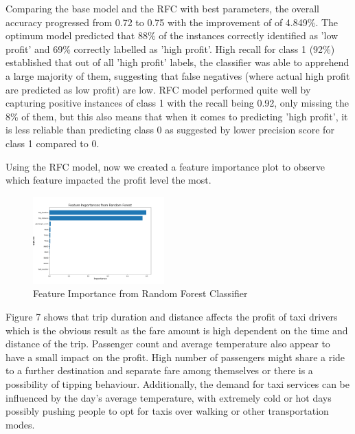 \documentclass[11pt]{article}
\begin{document}
Comparing the base model and the RFC with best parameters, the overall accuracy progressed from 0.72 to 0.75 with the improvement of of 4.849\%. The optimum model predicted that 88\% of the instances correctly identified as 'low profit' and 69\% correctly labelled as 'high profit'. High recall for class 1 (92\%) established that out of all 'high profit' labels, the classifier was able to apprehend a large majority of them, suggesting that false negatives (where actual high profit are predicted as low profit) are low. RFC model performed quite well by capturing positive instances of class 1 with the recall being 0.92, only missing the 8\% of them, but this also means that when it comes to predicting 'high profit', it is less reliable than predicting class 0 as suggested by lower precision score for class 1 compared to 0. 

Using the RFC model, now we created a feature importance plot to observe which feature impacted the profit level the most. 

\begin{figure}[H]
    \includegraphics[width=0.45\textwidth]{plots/Feature importances from RFC.png}
    \centering
    \caption{Feature Importance from Random Forest Classifier} %
\end{figure}

Figure 7 shows that trip duration and distance affects the profit of taxi drivers which is the obvious result as the fare amount is high dependent on the time and distance of the trip. Passenger count and average temperature also appear to have a small impact on the profit. High number of passengers might share a ride to a further destination and separate fare among themselves or there is a possibility of tipping behaviour. Additionally, the demand for taxi services can be influenced by the day's average temperature, with extremely cold or hot days possibly pushing people to opt for taxis over walking or other transportation modes.
\end{document}
